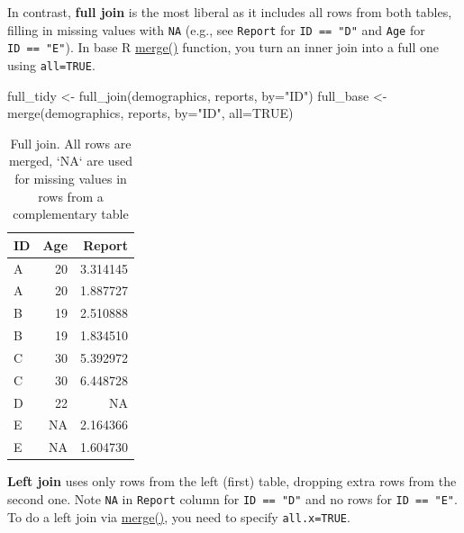 \documentclass[
]{book}
\newenvironment{Shaded}{\begin{snugshade}}{\end{snugshade}}
\newcommand{\AttributeTok}[1]{\textcolor[rgb]{0.77,0.63,0.00}{#1}}
\newcommand{\ConstantTok}[1]{\textcolor[rgb]{0.00,0.00,0.00}{#1}}
\newcommand{\FunctionTok}[1]{\textcolor[rgb]{0.00,0.00,0.00}{#1}}
\newcommand{\NormalTok}[1]{#1}
\newcommand{\OtherTok}[1]{\textcolor[rgb]{0.56,0.35,0.01}{#1}}
\newcommand{\StringTok}[1]{\textcolor[rgb]{0.31,0.60,0.02}{#1}}
\begin{document}
In contrast, \textbf{full join} is the most liberal as it includes all rows from both tables, filling in missing values with \texttt{NA} (e.g., see \texttt{Report} for \texttt{ID\ ==\ "D"} and \texttt{Age} for \texttt{ID\ ==\ "E"}). In base R \href{https://stat.ethz.ch/R-manual/R-devel/library/base/html/merge.html}{merge()} function, you turn an inner join into a full one using \texttt{all=TRUE}.

\begin{Shaded}
\begin{Highlighting}[]
\NormalTok{full\_tidy }\OtherTok{\textless{}{-}} \FunctionTok{full\_join}\NormalTok{(demographics, reports, }\AttributeTok{by=}\StringTok{"ID"}\NormalTok{) }
\NormalTok{full\_base }\OtherTok{\textless{}{-}} \FunctionTok{merge}\NormalTok{(demographics, reports, }\AttributeTok{by=}\StringTok{"ID"}\NormalTok{, }\AttributeTok{all=}\ConstantTok{TRUE}\NormalTok{)}
\end{Highlighting}
\end{Shaded}

\begin{table}

\caption{\label{tab:unnamed-chunk-184}Full join. All rows are merged, `NA` are used for missing values in rows from a complementary table}
\centering
\begin{tabular}[t]{l|r|r}
\hline
ID & Age & Report\\
\hline
A & 20 & 3.314145\\
\hline
A & 20 & 1.887727\\
\hline
B & 19 & 2.510888\\
\hline
B & 19 & 1.834510\\
\hline
C & 30 & 5.392972\\
\hline
C & 30 & 6.448728\\
\hline
D & 22 & NA\\
\hline
E & NA & 2.164366\\
\hline
E & NA & 1.604730\\
\hline
\end{tabular}
\end{table}

\textbf{Left join} uses only rows from the left (first) table, dropping extra rows from the second one. Note \texttt{NA} in \texttt{Report} column for \texttt{ID\ ==\ "D"} and no rows for \texttt{ID\ ==\ "E"}. To do a left join via \href{https://stat.ethz.ch/R-manual/R-devel/library/base/html/merge.html}{merge()}, you need to specify \texttt{all.x=TRUE}.
\end{document}
